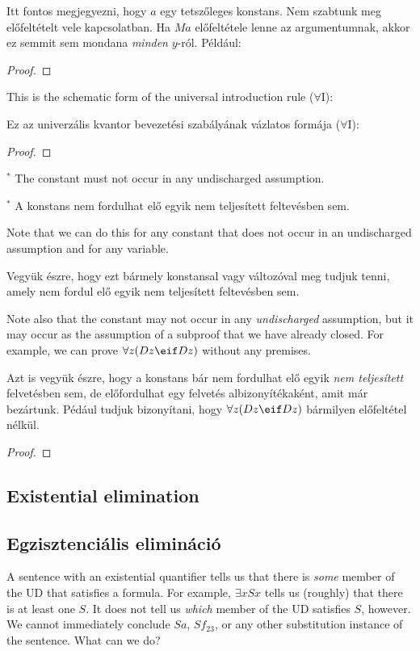 Itt fontos megjegyezni, hogy $a$ egy tetszőleges konstans. Nem szabtunk meg előfeltételt vele kapcsolatban. Ha $Ma$ előfeltétele lenne az argumentumnak, akkor ez semmit sem mondana \emph{minden} $y$-ról. Például:

\begin{proof}
	 
	 
\end{proof}

This is the schematic form of the universal introduction rule ($\forall$I):

Ez az univerzális kvantor bevezetési szabályának vázlatos formája ($\forall$I):

\begin{proof}
	 
\end{proof}
$^\ast$ The constant  must not occur in any undischarged assumption.

$^\ast$ A  konstans nem fordulhat elő egyik nem teljesített feltevésben sem.

Note that we can do this for any constant that does not occur in an undischarged assumption and for any variable.

Vegyük észre, hogy ezt bármely konstansal vagy változóval meg tudjuk tenni, amely nem fordul elő egyik nem teljesített feltevésben sem.

Note also that the constant may not occur in any \emph{undischarged} assumption, but it may occur as the assumption of a subproof that we have already closed. For example, we can prove $\forall z(Dz \eif Dz)$ without any premises.

Azt is vegyük észre, hogy a konstans bár nem fordulhat elő egyik \emph{nem teljesített} felvetésben sem, de előfordulhat egy felvetés albizonyítékaként, amit már bezártunk. Pédául tudjuk bizonyítani, hogy  $\forall z(Dz \eif Dz)$ bármilyen előfeltétel nélkül.

\begin{proof}
	\open
	\close
\end{proof}


\subsection*{Existential elimination}
\subsection{Egzisztenciális elimináció}
A sentence with an existential quantifier tells us that there is \emph{some} member of the UD that satisfies a formula. For example, $\exists x Sx$ tells us (roughly) that there is at least one $S$. It does not tell us \emph{which} member of the UD satisfies $S$, however. We cannot immediately conclude $Sa$, $Sf_{23}$, or any other substitution instance of the sentence. What can we do?

